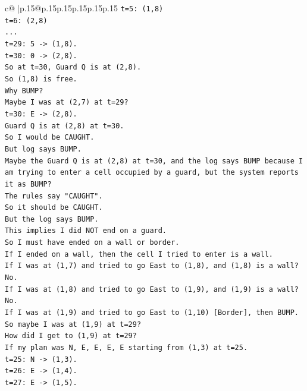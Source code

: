 \documentclass{article}
\begin{document}
{\begin{supertabular}{c@{$\;$}|p{.15\linewidth}@{}p{.15\linewidth}p{.15\linewidth}p{.15\linewidth}p{.15\linewidth}p{.15\linewidth}}
{{{\texttt{t=5: (1,8)} \\
\texttt{t=6: (2,8)} \\
\texttt{...} \\
\texttt{t=29: 5 {-}> (1,8).} \\
\texttt{t=30: 0 {-}> (2,8).} \\
\texttt{So at t=30, Guard Q is at (2,8).} \\
\texttt{So (1,8) is free.} \\
\texttt{Why BUMP?} \\
\texttt{Maybe I was at (2,7) at t=29?} \\
\texttt{t=30: E {-}> (2,8).} \\
\texttt{Guard Q is at (2,8) at t=30.} \\
\texttt{So I would be CAUGHT.} \\
\texttt{But log says BUMP.} \\
\texttt{Maybe the Guard Q is at (2,8) at t=30, and the log says BUMP because I am trying to enter a cell occupied by a guard, but the system reports it as BUMP?} \\
\texttt{The rules say "CAUGHT".} \\
\texttt{So it should be CAUGHT.} \\
\texttt{But the log says BUMP.} \\
\texttt{This implies I did NOT end on a guard.} \\
\texttt{So I must have ended on a wall or border.} \\
\texttt{If I ended on a wall, then the cell I tried to enter is a wall.} \\
\texttt{If I was at (1,7) and tried to go East to (1,8), and (1,8) is a wall?} \\
\texttt{No.} \\
\texttt{If I was at (1,8) and tried to go East to (1,9), and (1,9) is a wall?} \\
\texttt{No.} \\
\texttt{If I was at (1,9) and tried to go East to (1,10) {[}Border{]}, then BUMP.} \\
\texttt{So maybe I was at (1,9) at t=29?} \\
\texttt{How did I get to (1,9) at t=29?} \\
\texttt{If my plan was N, E, E, E, E starting from (1,3) at t=25.} \\
\texttt{t=25: N {-}> (1,3).} \\
\texttt{t=26: E {-}> (1,4).} \\
\texttt{t=27: E {-}> (1,5).} \\
}}}
\end{supertabular}}
\end{document}
